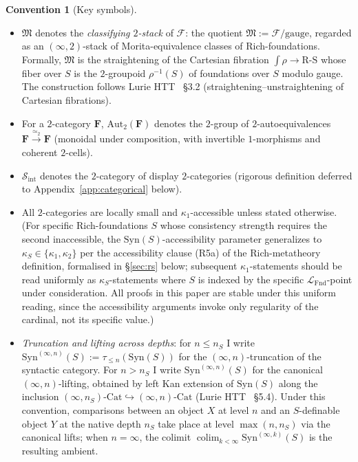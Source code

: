 \documentclass[11pt]{article}
\theoremstyle{plain}
\theoremstyle{definition}
\newtheorem{convention}[theorem]{Convention}
\newcommand{\cS}{\mathcal{S}}
\newcommand{\cF}{\mathcal{F}}
\newcommand{\fM}{\mathfrak{M}}
\newcommand{\LFnd}{\mathcal{L}_{\mathrm{Fnd}}}
\newcommand{\Sint}{\cS_{\mathrm{int}}}
\newcommand{\Cat}{\mathrm{Cat}}
\newcommand{\Syn}{\mathrm{Syn}}
\DeclareMathOperator{\colim}{colim}
\begin{document}
\begin{convention}[Key symbols]
\begin{itemize}
\item $\fM$ denotes the \emph{classifying $2$-stack} of $\cF$: the quotient $\fM := \cF / \text{gauge}$, regarded as an $(\infty, 2)$-stack of Morita-equivalence classes of Rich-foundations. Formally, $\fM$ is the straightening of the Cartesian fibration $\int \rho \to \mathrm{R\text{-}S}$ whose fiber over $S$ is the $2$-groupoid $\rho^{-1}(S)$ of foundations over $S$ modulo gauge. The construction follows Lurie HTT~\cite{LurieHTT} \S 3.2 (straightening--unstraightening of Cartesian fibrations).
\item For a $2$-category $\mathbf{F}$, $\mathrm{Aut}_2(\mathbf{F})$ denotes the $2$-group of $2$-autoequivalences $\mathbf{F} \xrightarrow{\simeq_2} \mathbf{F}$ (monoidal under composition, with invertible $1$-morphisms and coherent $2$-cells).
\item $\Sint$ denotes the $2$-category of display $2$-categories (rigorous definition deferred to Appendix~\ref{app:categorical} below).
\item All $2$-categories are locally small and $\kappa_1$-accessible unless stated otherwise. (For specific Rich-foundations $S$ whose consistency strength requires the second inaccessible, the $\Syn(S)$-accessibility parameter generalizes to $\kappa_S \in \{\kappa_1, \kappa_2\}$ per the accessibility clause (R5a) of the Rich-metatheory definition, formalised in \S\ref{sec:rs} below; subsequent $\kappa_1$-statements should be read uniformly as $\kappa_S$-statements where $S$ is indexed by the specific $\LFnd$-point under consideration. All proofs in this paper are stable under this uniform reading, since the accessibility arguments invoke only regularity of the cardinal, not its specific value.)
\item \emph{Truncation and lifting across depths}: for $n \leq n_S$ I write $\Syn^{(\infty, n)}(S) := \tau_{\leq n}(\Syn(S))$ for the $(\infty, n)$-truncation of the syntactic category. For $n > n_S$ I write $\Syn^{(\infty, n)}(S)$ for the canonical $(\infty, n)$-lifting, obtained by left Kan extension of $\Syn(S)$ along the inclusion $(\infty, n_S)\text{-}\Cat \hookrightarrow (\infty, n)\text{-}\Cat$ (Lurie HTT~\cite{LurieHTT} \S 5.4). Under this convention, comparisons between an object $X$ at level $n$ and an $S$-definable object $Y$ at the native depth $n_S$ take place at level $\max(n, n_S)$ via the canonical lifts; when $n = \infty$, the colimit $\colim_{k < \infty} \Syn^{(\infty, k)}(S)$ is the resulting ambient.
\end{itemize}
\end{convention}
\end{document}
